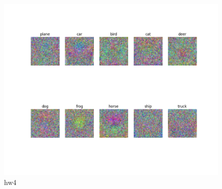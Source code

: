 \documentclass[pdftex,11pt]{article}
\begin{document}
\begin{figure}[H]
  \caption{hw4}
  \centering
    \includegraphics[scale=0.5]{hw4fe.png}
\end{figure}










 
\end{document}
